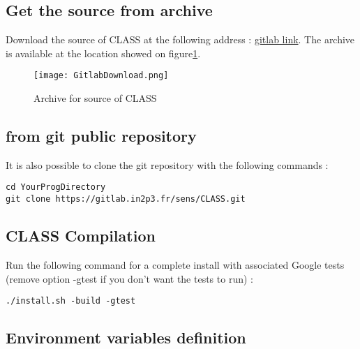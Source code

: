 \subsection{Get the source from archive}

Download the source of CLASS at the following address : \href{https://gitlab.in2p3.fr/sens/CLASS/tree/master}{gitlab link}. The archive is available at the location showed on figure\ref{fig:CLASSArchive}.

    \begin{figure}[H]
    \centering
    \centerline{\texttt{[image: GitlabDownload.png]}}
    \caption{Archive for source of CLASS}
    \label{fig:CLASSArchive}
    \end{figure}

\subsection{from git public repository}

It is also possible to clone the git repository with the following commands : 

\begin{center}
\begin{minipage}{\textwidth}
\begin{lstlisting}[style=terminal]
cd YourProgDirectory
git clone https://gitlab.in2p3.fr/sens/CLASS.git
\end{lstlisting}
\end{minipage}
\end{center}

\subsection{CLASS Compilation}

Run the following command for a complete install with associated Google tests (remove option -gtest if you don't want the tests to run) : 

\begin{center}
\begin{minipage}{\textwidth}
\begin{lstlisting}[style=terminal]
./install.sh -build -gtest
\end{lstlisting}
\end{minipage}
\end{center}

\subsection{Environment variables definition}

